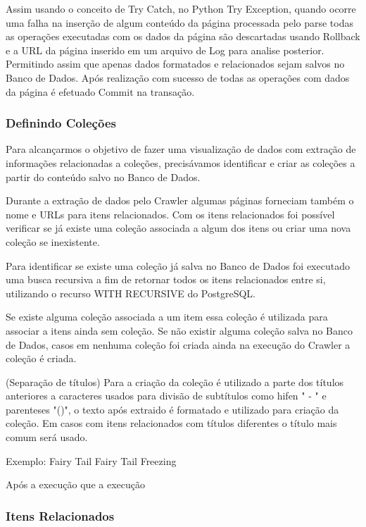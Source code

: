 \documentclass[12pt]{article}
\begin{document}
Assim usando o conceito de Try Catch, no Python Try Exception, quando ocorre uma falha na inserção de algum conteúdo da página processada pelo parse todas as operações executadas com os dados da página são descartadas usando Rollback e a URL da página inserido em um arquivo de Log para analise posterior. Permitindo assim que apenas dados formatados e relacionados sejam salvos no Banco de Dados.
Após realização com sucesso de todas as operações com dados da página é efetuado Commit na transação.

\subsubsection{Definindo Coleções}

Para alcançarmos o objetivo de fazer uma visualização de dados com extração de informações relacionadas a coleções, precisávamos identificar e criar as coleções a partir do conteúdo salvo no Banco de Dados.

Durante a extração de dados pelo Crawler algumas páginas forneciam também o nome e URLs para itens relacionados. Com os itens relacionados foi possível verificar se já existe uma coleção associada a algum dos itens ou criar uma nova coleção se inexistente.

Para identificar se existe uma coleção já salva no Banco de Dados foi executado uma busca recursiva a fim de retornar todos os itens relacionados entre si, utilizando o recurso WITH RECURSIVE do PostgreSQL.

Se existe alguma coleção associada a um item essa coleção é utilizada para associar a itens ainda sem coleção. Se não existir alguma coleção salva no Banco de Dados, casos em nenhuma coleção foi criada ainda na execução do Crawler a coleção é criada.

(Separação de títulos)
Para a criação da coleção é utilizado a parte dos títulos anteriores a caracteres usados para divisão de subtítulos como hifen " - " e parenteses "()", o texto após extraido é formatado e utilizado para criação da coleção. 
Em casos com itens relacionados com títulos diferentes o título mais comum será usado.  


Exemplo:
		Fairy Tail
		Fairy Tail Freezing

		
		
Após a execução 
que a execução 

\subsubsection{Itens Relacionados}
\end{document}
